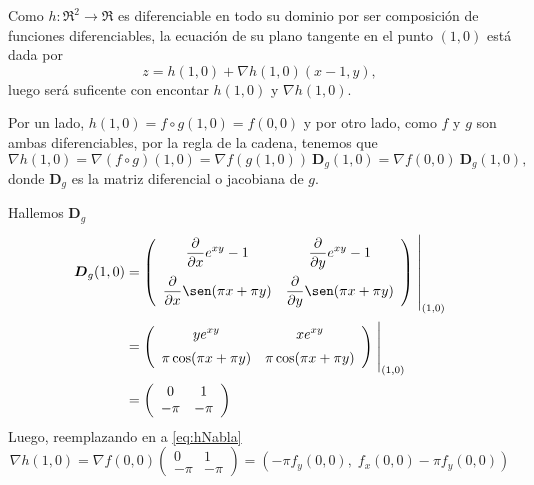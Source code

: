 \begin{solution}

    Como   $h:\Re^2\to\Re$ es diferenciable en todo su dominio por ser composición de funciones diferenciables,  la ecuaci\'on de su plano tangente en el punto $(1,0)$ est\'a dada por
    \begin{equation}
        z= h(1,0) + \nabla h(1,0) (x-1,y),  \label{eq:zNabla}
    \end{equation}   luego ser\'a  suficente con encontar $ h(1,0)$ y $\nabla h(1,0).$

    Por un lado,      $h(1,0)= f\circ g (1,0) =  f(0,0)$  y por otro lado,  como $f$ y $g$ son ambas diferenciables,  por la regla de la cadena,  tenemos que
    \begin{equation}
        \nabla h(1,0)=\nabla (f\circ g)(1,0)=\nabla f(g(1,0)) \:\boldsymbol{D}_g(1,0) = \nabla f (0,0) \:\boldsymbol{D}_g(1,0),  \label{eq:hNabla}
    \end{equation}    donde $\boldsymbol{D}_g$ es la matriz diferencial o  jacobiana de $g$.

    \noindent  Hallemos $\boldsymbol{D}_g$
    \begin{align*}
        \boldsymbol{D}_g(1,0) & =
        \left(\begin{array}{cc}
                      \displaystyle\partialx e^{xy}-1            & \displaystyle\partialy e^{xy}-1           \\[10pt]
                      \displaystyle\partialx  \sen (\pi x+\pi y) & \displaystyle\partialy \sen (\pi x+\pi y)
                  \end{array}\right)\left.\rule{0pt}{1.1cm}\right\rvert_{(1,0)}             \\[2pt]
                              & =\left(\begin{array}{cc}
                                               \displaystyle ye^{xy}                 & \displaystyle xe^{xy}              \\[5pt]
                                               \displaystyle   \pi\cos (\pi x+\pi y) & \displaystyle \pi\cos(\pi x+\pi y)
                                           \end{array}\right)\left.\rule{0pt}{0.7cm}\right\rvert_{(1,0)} \\[2pt]
                              & =\left(\begin{array}{cc}
                                               0    & 1    \\
                                               -\pi & -\pi
                                           \end{array}\right)
    \end{align*}
    Luego, reemplazando en  a   \eqref{eq:hNabla}
    \[
        \nabla h(1,0) = \nabla f(0,0)\left(\begin{array}{cc}
                0    & 1    \\
                -\pi & -\pi
            \end{array}\right) = \left(-\pi f_y(0,0),\;f_x(0,0)-\pi f_y(0,0)\right)
    \]


\end{solution}
